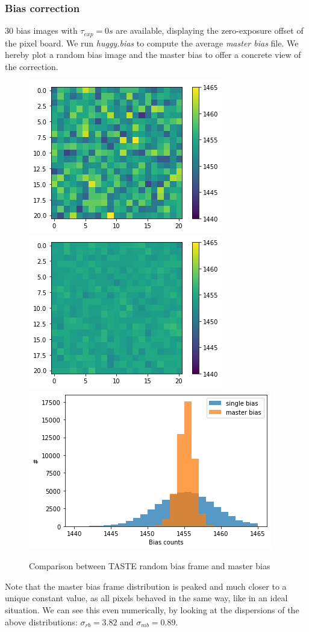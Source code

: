 \documentclass{aa}
\begin{document}
\subsubsection{Bias correction}
30 bias images with $\tau_{exp}=0s$
are available, displaying the zero-exposure offset of the pixel board. We run \textit{huggy.bias} to compute the average \textit{master bias} file. We hereby plot a random bias image and the master bias to offer a concrete view of the correction.
\begin{figure}[h]
    \centering  
    \includegraphics[scale=0.35, angle=0]{pictures/bias.png}
    \includegraphics[scale=0.35, angle=0]{pictures/master_bias.png}
    \includegraphics[scale=0.45, angle=0]{pictures/bias_comp.png}
    \caption{Comparison between TASTE random bias frame and master bias}
\end{figure}
Note that the master bias frame distribution is peaked and much closer to a unique constant value, as all pixels behaved in the same way, like in an ideal situation. We can see this even numerically, by looking at the dispersions of the above distributions: $\sigma_{rb} = 3.82$ and 
$\sigma_{mb} = 0.89$.
\end{document}
